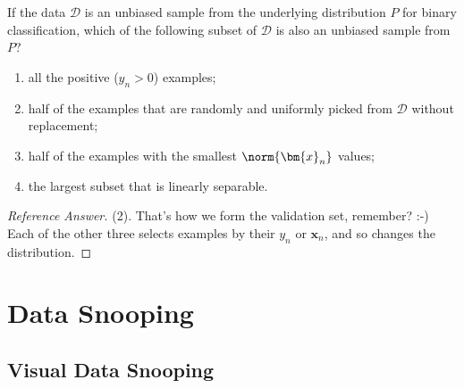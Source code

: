 \begin{exercise}
    If the data \(\mathcal{D}\) is an unbiased sample from the underlying
    distribution \(P\) for binary classification, which of the following
    subset of \(\mathcal{D}\) is also an unbiased sample from \(P\)?
    \begin{enumerate}[(1)]
        \item all the positive (\(y_n > 0\)) examples;
        \item half of the examples that are randomly and uniformly picked from
            \(\mathcal{D}\) without replacement;
        \item half of the examples with the smallest \(\norm{\bm{x}_n}\)
            values;
        \item the largest subset that is linearly separable.
    \end{enumerate}
\end{exercise}

\begin{proof}[Reference Answer]
    (2). That's how we form the validation set, remember? :-) Each of the
    other three selects examples by their \(y_n\) or \(\bm{x}_n\), and so
    changes the distribution.
\end{proof}

\section{Data Snooping}\label{sec:data-snooping}


\subsection{Visual Data Snooping}

